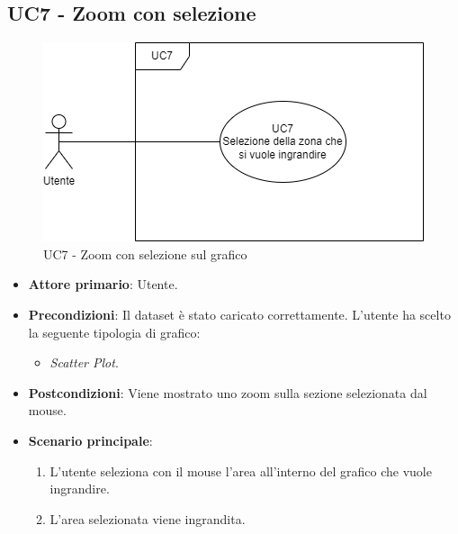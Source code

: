 \subsection{UC7 - Zoom con selezione}
\label{sec:UC7}
\begin{figure}[h!]
    \centering
    \includegraphics[scale=0.55]{../../assets/zoom_selezione.png}
    \caption{UC7 - Zoom con selezione sul grafico}
\end{figure}
\begin{itemize}
    \item \textbf{Attore primario}: Utente.
    \item \textbf{Precondizioni}: Il dataset è stato caricato correttamente. L'utente ha scelto la seguente tipologia di grafico:
    \begin{itemize}
    		\item \textit{Scatter Plot}.
    \end{itemize}
    \item \textbf{Postcondizioni}: Viene mostrato uno zoom sulla sezione selezionata dal mouse.
    \item \textbf{Scenario principale}:
          \begin{enumerate}
              \item L'utente seleziona con il mouse l'area all'interno del grafico che vuole ingrandire.
              \item L'area selezionata viene ingrandita.
          \end{enumerate}
\end{itemize}

